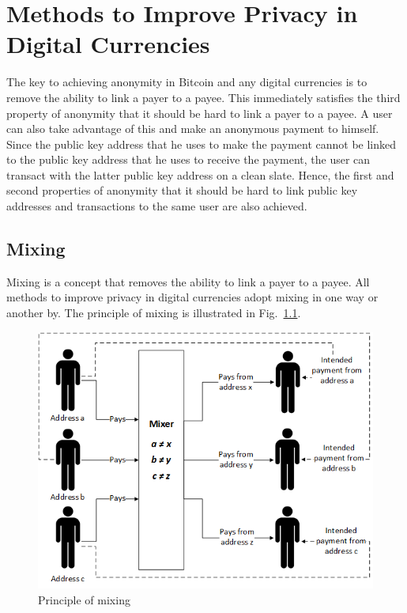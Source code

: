 
\ifpdf
\graphicspath{{Chapter2/Figs/}}
\else
\graphicspath{{Chapter2/Figs/}}
\fi

\chapter{Methods to Improve Privacy in Digital Currencies}
\label{ch:Methods to Improve Privacy in Digital Currencies}

The key to achieving anonymity in Bitcoin and any digital currencies is to remove the ability to link a payer to a payee. This immediately satisfies the third property of anonymity that it should be hard to link a payer to a payee. A user can also take advantage of this and make an anonymous payment to himself. Since the public key address that he uses to make the payment cannot be linked to the public key address that he uses to receive the payment, the user can transact with the latter public key address on a clean slate. Hence, the first and second properties of anonymity that it should be hard to link public key addresses and transactions to the same user are also achieved.

\section{Mixing}
\label{sec:2-Mixing}
Mixing is a concept that removes the ability to link a payer to a payee. All methods to improve privacy in digital currencies adopt mixing in one way or another by. The principle of mixing is illustrated in Fig.~\ref{fig:mixing}.

\begin{figure}[H]
	\begin{center}
		\includegraphics[scale=0.7]{mixing} 
		\caption{Principle of mixing}
		\label{fig:mixing} 
	\end{center}
\end{figure}

